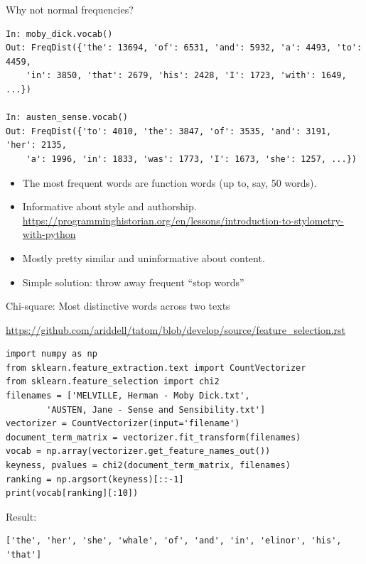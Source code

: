 \documentclass[aspectratio=169,usenames,dvipsnames]{beamer}
\begin{document}
\begin{frame}[fragile]{Why not normal frequencies?}
\begin{lstlisting}
In: moby_dick.vocab()
Out: FreqDist({'the': 13694, 'of': 6531, 'and': 5932, 'a': 4493, 'to': 4459,
    'in': 3850, 'that': 2679, 'his': 2428, 'I': 1723, 'with': 1649, ...})

In: austen_sense.vocab()
Out: FreqDist({'to': 4010, 'the': 3847, 'of': 3535, 'and': 3191, 'her': 2135,
    'a': 1996, 'in': 1833, 'was': 1773, 'I': 1673, 'she': 1257, ...})
\end{lstlisting}

\begin{itemize}
    \item The most frequent words are function words (up to, say, 50 words).
    \item Informative about style and authorship.
        \url{https://programminghistorian.org/en/lessons/introduction-to-stylometry-with-python}
    \item Mostly pretty similar and uninformative about content.
    \item Simple solution: throw away frequent ``stop words''
\end{itemize}
\end{frame}

\begin{frame}[fragile]{Chi-square: Most distinctive words across two texts}
    \begin{reference}
        \url{https://github.com/ariddell/tatom/blob/develop/source/feature_selection.rst}
    \end{reference}
\begin{lstlisting}[style=smaller]
import numpy as np
from sklearn.feature_extraction.text import CountVectorizer
from sklearn.feature_selection import chi2
filenames = ['MELVILLE, Herman - Moby Dick.txt',
        'AUSTEN, Jane - Sense and Sensibility.txt']
vectorizer = CountVectorizer(input='filename')
document_term_matrix = vectorizer.fit_transform(filenames)
vocab = np.array(vectorizer.get_feature_names_out())
keyness, pvalues = chi2(document_term_matrix, filenames)
ranking = np.argsort(keyness)[::-1]
print(vocab[ranking][:10])
\end{lstlisting}
Result:
\begin{lstlisting}
['the', 'her', 'she', 'whale', 'of', 'and', 'in', 'elinor', 'his', 'that']
\end{lstlisting}
\end{frame}
\end{document}
